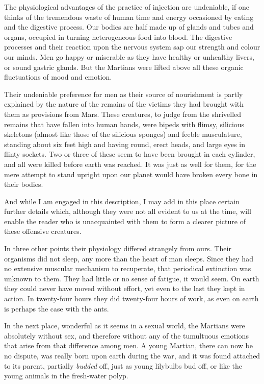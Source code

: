 The physiological advantages of the practice of injection are
undeniable, if one thinks of the tremendous waste of human time and
energy occasioned by eating and the digestive process. Our bodies
are half made up of glands and tubes and organs, occupied in
turning heterogeneous food into blood. The digestive processes and
their reaction upon the nervous system sap our strength and colour
our minds. Men go happy or miserable as they have healthy or
unhealthy livers, or sound gastric glands. But the Martians were
lifted above all these organic fluctuations of mood and emotion.

Their undeniable preference for men as their source of nourishment
is partly explained by the nature of the remains of the victims
they had brought with them as provisions from Mars. These
creatures, to judge from the shrivelled remains that have fallen
into human hands, were bipeds with flimsy, silicious skeletons
(almost like those of the silicious sponges) and feeble
musculature, standing about six feet high and having round, erect
heads, and large eyes in flinty sockets. Two or three of these seem
to have been brought in each cylinder, and all were killed before
earth was reached. It was just as well for them, for the mere
attempt to stand upright upon our planet would have broken every
bone in their bodies.

And while I am engaged in this description, I may add in this place
certain further details which, although they were not all evident
to us at the time, will enable the reader who is unacquainted with
them to form a clearer picture of these offensive creatures.

In three other points their physiology differed strangely from
ours. Their organisms did not sleep, any more than the heart of man
sleeps. Since they had no extensive muscular mechanism to
recuperate, that periodical extinction was unknown to them. They
had little or no sense of fatigue, it would seem. On earth they
could never have moved without effort, yet even to the last they
kept in action. In twenty-four hours they did twenty-four hours of
work, as even on earth is perhaps the case with the ants.

In the next place, wonderful as it seems in a sexual world, the
Martians were absolutely without sex, and therefore without any of
the tumultuous emotions that arise from that difference among men.
A young Martian, there can now be no dispute, was really born upon
earth during the war, and it was found attached to its parent,
partially \emph{budded} off, just as young lilybulbs bud off, or
like the young animals in the fresh-water polyp.

